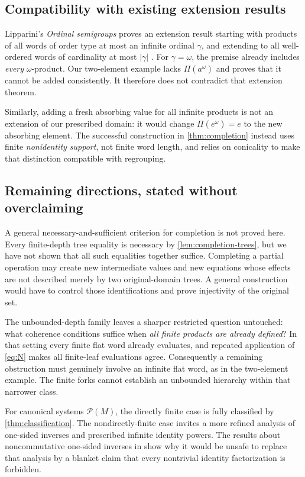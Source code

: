 \documentclass[11pt,letterpaper]{article}
\numberwithin{equation}{section}
\theoremstyle{definition}
\theoremstyle{remark}
\newcommand{\PP}{\mathcal{P}}
\begin{document}
\subsection{Compatibility with existing extension results}
Lipparini's \emph{Ordinal semigroups} proves an extension result starting with products of all words of order type at most an infinite ordinal $\gamma$, and extending to all well-ordered words of cardinality at most $|\gamma|$ \cite{LippariniOrd}. For $\gamma=\omega$, the premise already includes \emph{every} $\omega$-product. Our two-element example lacks $\Pi(a^\omega)$ and proves that it cannot be added consistently. It therefore does not contradict that extension theorem.

Similarly, adding a fresh absorbing value for all infinite products is not an extension of our prescribed domain: it would change $\Pi(e^\omega)=e$ to the new absorbing element. The successful construction in \cref{thm:completion} instead uses finite \emph{nonidentity support}, not finite word length, and relies on conicality to make that distinction compatible with regrouping.

\subsection{Remaining directions, stated without overclaiming}
A general necessary-and-sufficient criterion for completion is not proved here. Every finite-depth tree equality is necessary by \cref{lem:completion-trees}, but we have not shown that all such equalities together suffice. Completing a partial operation may create new intermediate values and new equations whose effects are not described merely by two original-domain trees. A general construction would have to control those identifications and prove injectivity of the original set.

The unbounded-depth family leaves a sharper restricted question untouched: what coherence conditions suffice when \emph{all finite products are already defined}? In that setting every finite flat word already evaluates, and repeated application of \eqref{eq:N} makes all finite-leaf evaluations agree. Consequently a remaining obstruction must genuinely involve an infinite flat word, as in the two-element example. The finite forks cannot establish an unbounded hierarchy within that narrower class.

For canonical systems $\PP(M)$, the directly finite case is fully classified by \cref{thm:classification}. The nondirectly-finite case invites a more refined analysis of one-sided inverses and prescribed infinite identity powers. The results about noncommutative one-sided inverses in \cite{LippariniInv} show why it would be unsafe to replace that analysis by a blanket claim that every nontrivial identity factorization is forbidden.
\end{document}
